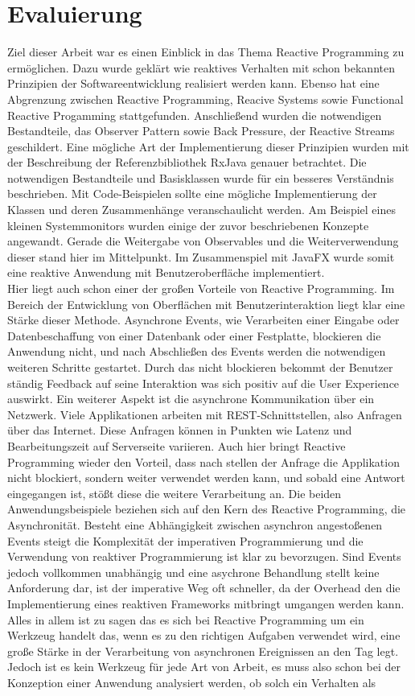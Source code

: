 \chapter{Evaluierung}\label{eval}
Ziel dieser Arbeit war es einen Einblick in das Thema Reactive Programming zu ermöglichen. Dazu wurde geklärt wie reaktives Verhalten mit schon bekannten Prinzipien der Softwareentwicklung realisiert werden kann. Ebenso hat eine Abgrenzung zwischen Reactive Programming, Reacive Systems sowie Functional Reactive Progamming stattgefunden. Anschließend wurden die notwendigen Bestandteile, das Observer Pattern sowie Back Pressure, der Reactive Streams geschildert. Eine mögliche Art der Implementierung dieser Prinzipien wurden mit der Beschreibung der Referenzbibliothek RxJava genauer betrachtet. Die notwendigen Bestandteile und Basisklassen wurde für ein besseres Verständnis beschrieben. Mit Code-Beispielen sollte eine mögliche Implementierung der Klassen und deren Zusammenhänge veranschaulicht werden. Am Beispiel eines kleinen Systemmonitors wurden einige der zuvor beschriebenen Konzepte angewandt. Gerade die Weitergabe von Observables und die Weiterverwendung dieser stand hier im Mittelpunkt. Im Zusammenspiel mit JavaFX wurde somit eine reaktive Anwendung mit Benutzeroberfläche implementiert. \\ Hier liegt auch schon einer der großen Vorteile von Reactive Programming. Im Bereich der Entwicklung von Oberflächen mit Benutzerinteraktion liegt klar eine Stärke dieser Methode. Asynchrone Events, wie Verarbeiten einer Eingabe oder Datenbeschaffung von einer Datenbank oder einer Festplatte, blockieren die Anwendung nicht, und nach Abschließen des Events werden die notwendigen weiteren Schritte gestartet. Durch das nicht blockieren bekommt der Benutzer ständig Feedback auf seine Interaktion was sich positiv auf die User Experience auswirkt. Ein weiterer Aspekt ist die asynchrone Kommunikation über ein Netzwerk. Viele Applikationen arbeiten mit REST-Schnittstellen, also Anfragen über das Internet. Diese Anfragen können in Punkten wie Latenz und Bearbeitungszeit auf Serverseite variieren. Auch hier bringt Reactive Programming wieder den Vorteil, dass nach stellen der Anfrage die Applikation nicht blockiert, sondern weiter verwendet werden kann, und sobald eine Antwort eingegangen ist, stößt diese die weitere Verarbeitung an. Die beiden Anwendungsbeispiele beziehen sich auf den Kern des Reactive Programming, die Asynchronität. Besteht eine Abhängigkeit zwischen asynchron angestoßenen Events steigt die Komplexität der imperativen Programmierung und die Verwendung von reaktiver Programmierung ist klar zu bevorzugen. Sind Events jedoch vollkommen unabhängig und eine asychrone Behandlung stellt keine Anforderung dar, ist der imperative Weg oft schneller, da der Overhead den die Implementierung eines reaktiven Frameworks mitbringt umgangen werden kann. Alles in allem ist zu sagen das es sich bei Reactive Programming um ein Werkzeug handelt das, wenn es zu den richtigen Aufgaben verwendet wird, eine große Stärke in der Verarbeitung von asynchronen Ereignissen an den Tag legt. Jedoch ist es kein Werkzeug für jede Art von Arbeit, es muss also schon bei der Konzeption einer Anwendung analysiert werden, ob solch ein Verhalten als 